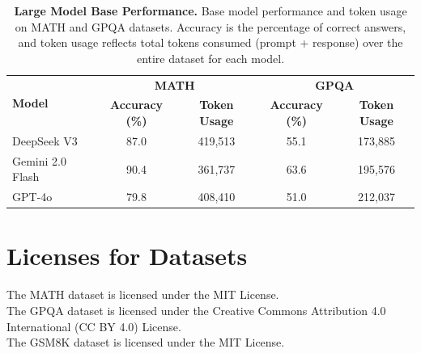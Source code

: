 \begin{table}[hbtp]
\centering
\begin{tabular}{lcccc}
\toprule
\multirow{2}{*}{\textbf{Model}} & \multicolumn{2}{c}{\textbf{MATH}} & \multicolumn{2}{c}{\textbf{GPQA}} \\
\cmidrule(lr){2-3} \cmidrule(lr){4-5}
& \textbf{Accuracy (\%)} & \textbf{Token Usage} & \textbf{Accuracy (\%)} & \textbf{Token Usage} \\
\midrule
DeepSeek V3       & 87.0  & 419,513   & 55.1  & 173,885 \\
Gemini 2.0 Flash  & 90.4  & 361,737   & 63.6  & 195,576 \\
GPT-4o            & 79.8  & 408,410   & 51.0  & 212,037 \\
\bottomrule
\end{tabular}
\vspace{5pt}
\caption{\textbf{Large Model Base Performance.} Base model performance and token usage on MATH and GPQA datasets. Accuracy is the percentage of correct answers, and token usage reflects total tokens consumed (prompt + response) over the entire dataset for each model.}
\label{tab:base-models}
\vspace{-15pt}
\end{table}


\section{Licenses for Datasets}
\label{sec:licenses}
The MATH dataset is licensed under the MIT License.\\
The GPQA dataset is licensed under the Creative Commons Attribution 4.0 International (CC BY 4.0) License.\\
The GSM8K dataset is licensed under the MIT License.
